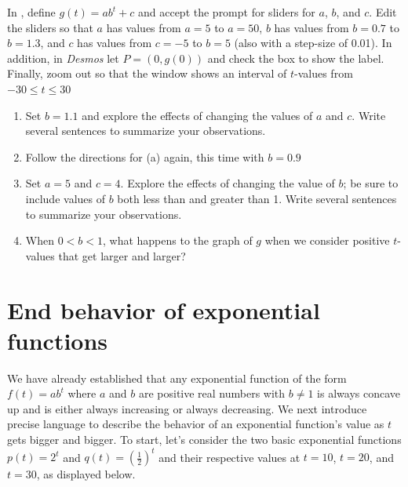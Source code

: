 \documentclass[nooutcomes]{ximera}
\begin{document}
\begin{exploration}
In , define $g(t) = ab^t+c$ and accept the prompt for sliders for $a$, $b$, and $c$. Edit the sliders so that $a$ has values from $a = 5$ to $a = 50$, $b$ has values from $b = 0.7$ to $b = 1.3$, and $c$ has values from $c = -5$ to $b = 5$ (also with a step-size of 0.01). In addition, in \emph{Desmos} let $P = (0, g(0))$ and check the box to show the label. Finally, zoom out so that the window shows an interval of $t$-values from $-30 \le t \le 30$
\begin{enumerate}[label=\alph*.]
\item Set $b = 1.1$ and explore the effects of changing the values of $a$ and $c$.  Write several sentences to summarize your observations.
\item Follow the directions for (a) again, this time with $b = 0.9$
\item Set $a = 5$ and $c = 4$. Explore the effects of changing the value of $b$; be sure to include values of $b$ both less than and greater than 1. Write several sentences to summarize your observations.
\item When $0 < b < 1$, what happens to the graph of $g$ when we consider positive $t$-values that get larger and larger?
\end{enumerate}
\end{exploration}



\section{End behavior of exponential functions}
We have already established that any exponential function of the form $f(t) = ab^t$ where $a$ and $b$ are positive real numbers with $b \ne 1$ is always concave up and is either always increasing or always decreasing.  We next introduce precise language to describe the behavior of an exponential function's value as $t$ gets bigger and bigger.  To start, let's consider the two basic exponential functions $p(t) = 2^t$ and $q(t) = \left(\frac{1}{2}\right)^t$ and their respective values at $t = 10$, $t = 20$, and $t = 30$, as displayed below.
\end{document}
